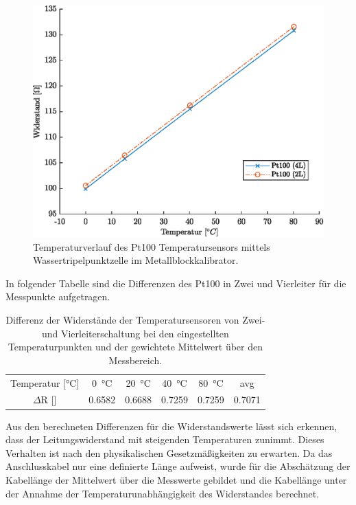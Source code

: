 \begin{figure}[H]
	\centering
	\includegraphics[height=0.2\textheight]{../MLAB/Vergleich2L4L.eps}
	\caption[Temperaturverlauf des Pt100 Temperatursensors mittels Wassertripelpunktzelle]{ Temperaturverlauf des Pt100 Temperatursensors mittels Wassertripelpunktzelle im Metallblockkalibrator.}
	\label{fig:2L4L}
\end{figure}

In folgender Tabelle sind die Differenzen des Pt100 in Zwei und Vierleiter für die Messpunkte aufgetragen.

\begin{table}[H]
	\centering
	\caption{Differenz der Widerstände der Temperatursensoren von Zwei- und Vierleiterschaltung bei den eingestellten Temperaturpunkten und der gewichtete Mittelwert über den Messbereich.}
	\label{tab:Vergleich}
	\begin{tabular}{cccccc}
		Temperatur [\si{\celsius}] & \SI{0}{\celsius} & \SI{20}{\celsius} & \SI{40}{\celsius}&\SI{80}{\celsius} & avg\\ 
		$\Delta$R [\ohm] & \num{0,6582} & \num{0.6688} &  \num{0,7259}& \num{0,7259}& \num{0.7071} \\
	\end{tabular} 
\end{table}

Aus den berechneten Differenzen für die Widerstandswerte lässt sich erkennen, dass der Leitungswiderstand mit steigenden Temperaturen zunimmt. Dieses Verhalten ist nach den physikalischen Gesetzmäßigkeiten zu erwarten. Da das Anschlusskabel nur eine definierte Länge aufweist, wurde für die Abschätzung der Kabellänge der Mittelwert über die Messwerte gebildet und die Kabellänge unter der Annahme der Temperaturunabhängigkeit des Widerstandes berechnet. 

